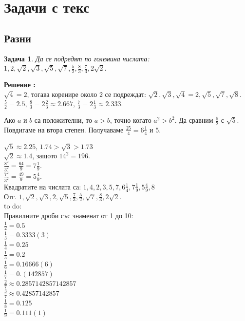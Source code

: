 \documentclass{article}
\newtheorem{problem}{Задача}
\newcounter{solution}
\newcommand\solution{%
	\stepcounter{solution}%
	\textbf{Решение :}\\%
}
\begin{document}
\section{Задачи с текс}

\subsection{Разни}

\begin{problem}
	Да се подредят по големина числата:
	$1, 2, \sqrt{2}, \sqrt{3}, \sqrt{5}, \sqrt{7}, 
	\frac{5}{2}, \frac{8}{3}, \frac{7}{3}, 2\sqrt{2}.  $
\end{problem}
\solution
$\sqrt{4} = 2$, тогава коренире около $2$ се подреждат:
$\sqrt2, \sqrt3, \sqrt4 = 2 , \sqrt5, \sqrt7, \sqrt8 $.
$ \frac{5}{2} = 2.5 $, $\frac{8}{3} = 2 \frac{2}{3} \approx 2.667$, $\frac{7}{3} = 2 \frac{1}{3} \approx 2.333  $.


Ако $a$ и $b$ са положителни, то $a > b $, точно когато $a^2 > b^2 $.
Да сравним $\frac{5}{2} $ с $\sqrt 5 $. Повдигаме на втора степен. Получаваме
$\frac{25}{4} = 6\frac{1}{4} $ и $5 $. 

$\sqrt{5} \approx 2.25$, $ 1.74 >\sqrt 3 > 1.73 $ \\
$\sqrt 2 \approx 1.4 $, защото $14^2 = 196 $. \\
$\frac{8^2}{3^2} = \frac{64}{9} = 7 \frac{1}{9} $. \\
$\frac{7^2}{3^2} = \frac{49}{9} = 5 \frac{4}{9} $. \\
Квадратите на числата са:
$1,4,2,3,5,7, 6\frac{1}{4}, 7 \frac{1}{9}, 5 \frac{4}{9},8  $ \\
Отг. 
$1, \sqrt 2, \sqrt 3, 2, \sqrt 5, \frac{7}{3}, \frac{5}{2}, \sqrt 7 , \frac{8}{3}, 2\sqrt2 $. \\


\vspace{2cm}
to do: \\
Правилните дроби със знаменат от 1 до 10: \\
$\frac{1}{2} = 0.5  $ \\
$\frac{1}{3} = 0.3333(3) $  \\
$\frac{1}{4} = 0.25  $ \\
$\frac{1}{5} = 0.2  $ \\
$\frac{1}{6} = 0.16666(6) $ \\
$\frac{1}{7} = 0.(142857) $ \\

$\frac{2}{7} \approx 0.2857142857142857 $ \\
$\frac{3}{7} \approx 0.42857142857 $ \\
$\frac{1}{8} = 0.125 $ \\
$\frac{1}{9} = 0.111(1) $ \\
\end{document}
